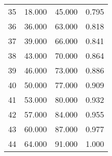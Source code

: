 \begin{tabular}{cccc}
  35 & 18.000 & 45.000 & 0.795 \\ 
  36 & 36.000 & 63.000 & 0.818 \\ 
  37 & 39.000 & 66.000 & 0.841 \\ 
  38 & 43.000 & 70.000 & 0.864 \\ 
  39 & 46.000 & 73.000 & 0.886 \\ 
  40 & 50.000 & 77.000 & 0.909 \\ 
  41 & 53.000 & 80.000 & 0.932 \\ 
  42 & 57.000 & 84.000 & 0.955 \\ 
  43 & 60.000 & 87.000 & 0.977 \\ 
  44 & 64.000 & 91.000 & 1.000 \\ 
   \hline
\end{tabular}
